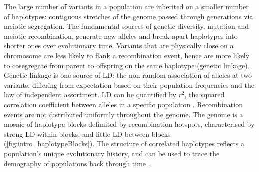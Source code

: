 The large number of variants in a population are inherited on a smaller number of haplotypes: contiguous stretches of the genome passed through generations via meiotic segregation.
The fundamental sources of genetic diversity, mutation and meiotic recombination, generate new alleles and break apart haplotypes into shorter ones over evolutionary time.
Variants that are physically close on a chromosome are less likely to flank a recombination event, hence are more likely to cosegregate from parent to offspring on the same haplotype (genetic linkage).
Genetic linkage is one source of \gls{LD}: the non-random association of alleles at two variants, differing from expectation based on their population frequencies and the law of independent assortment.
\gls{LD} can be quantified by $r^2$, the squared correlation coefficient between alleles in a specific population \autocite{slatkin2008LinkageDisequilibriumUnderstanding}.
%
Recombination events are not distributed uniformly throughout the genome.
The genome is a mosaic of haplotype blocks delimited by recombination hotspots, 
characterised by strong \gls{LD} within blocks, and little \gls{LD} between blocks \autocite{wall2003HaplotypeBlocksLinkage,theinternationalhapmapconsortium2007SecondGenerationHuman} (\cref{fig:intro_haplotypeBlocks}).
The structure of correlated haplotypes reflects a population's unique evolutionary history, and can be used to trace the demography of populations back through time \autocite{karczewski2020AnalyticTranslationalGenetics}.

